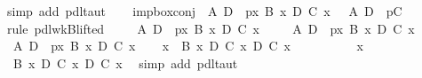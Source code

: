 \begin{isabellebody}
\ {\isacharparenleft}simp\ add{\isacharcolon}\ pdl{\isacharunderscore}taut{\isacharparenright}\isanewline
\ \ \isamarkupfalse%
\isanewline
\isamarkupfalse%
\isanewline
\isanewline
\isanewline
\isamarkupfalse%
\ imp{\isacharunderscore}box{\isacharunderscore}conj{}{\isacharcolon}\ {\isachardoublequote}{\isasymturnstile}\ A\ {\isasymlongrightarrow}\isactrlsub D\ {\isacharbrackleft}{\isacharhash}\ p{\isacharbrackright}{\isacharparenleft}{\isasymlambda}x{\isachardot}\ B\ x\ {\isasymand}\isactrlsub D\ C\ x{\isacharparenright}\ {\isasymLongrightarrow}\ {\isasymturnstile}\ A\ {\isasymlongrightarrow}\isactrlsub D\ {\isacharbrackleft}{\isacharhash}\ p{\isacharbrackright}C{\isachardoublequote}\isanewline
\isamarkupfalse%
\ {\isacharparenleft}rule\ pdl{\isacharunderscore}wkB{\isacharunderscore}lifted{}{\isacharparenright}\isanewline
\ \ \isamarkupfalse%
\ {\isachardoublequote}{\isasymturnstile}\ A\ {\isasymlongrightarrow}\isactrlsub D\ {\isacharbrackleft}{\isacharhash}\ p{\isacharbrackright}{\isacharparenleft}{\isasymlambda}x{\isachardot}\ B\ x\ {\isasymand}\isactrlsub D\ C\ x{\isacharparenright}{\isachardoublequote}\isanewline
\ \ \isamarkupfalse%
\ {\isachardoublequote}{\isasymturnstile}\ A\ {\isasymlongrightarrow}\isactrlsub D\ {\isacharbrackleft}{\isacharhash}\ p{\isacharbrackright}{\isacharparenleft}{\isasymlambda}x{\isachardot}\ B\ x\ {\isasymand}\isactrlsub D\ C\ x{\isacharparenright}{\isachardoublequote}\ \isamarkupfalse%
\isacommand{{\isachardot}}\isanewline
\isamarkupfalse%
\isanewline
\ \ \isamarkupfalse%
\ {\isachardoublequote}{\isasymturnstile}\ A\ {\isasymlongrightarrow}\isactrlsub D\ {\isacharbrackleft}{\isacharhash}\ p{\isacharbrackright}{\isacharparenleft}{\isasymlambda}x{\isachardot}\ B\ x\ {\isasymand}\isactrlsub D\ C\ x{\isacharparenright}{\isachardoublequote}\isanewline
\ \ \isamarkupfalse%
\ {\isachardoublequote}{\isasymforall}x{\isachardot}\ {\isasymturnstile}\ B\ x\ {\isasymand}\isactrlsub D\ C\ x\ {\isasymlongrightarrow}\isactrlsub D\ C\ x{\isachardoublequote}\isanewline
\ \ \isamarkupfalse%
\ \isanewline
\ \ \ \ \isamarkupfalse%
\ x\ \isamarkupfalse%
\ {\isachardoublequote}{\isasymturnstile}\ B\ x\ {\isasymand}\isactrlsub D\ C\ x\ {\isasymlongrightarrow}\isactrlsub D\ C\ x{\isachardoublequote}\ \isamarkupfalse%
\ {\isacharparenleft}simp\ add{\isacharcolon}\ pdl{\isacharunderscore}taut{\isacharparenright}\isanewline

\end{isabellebody}
